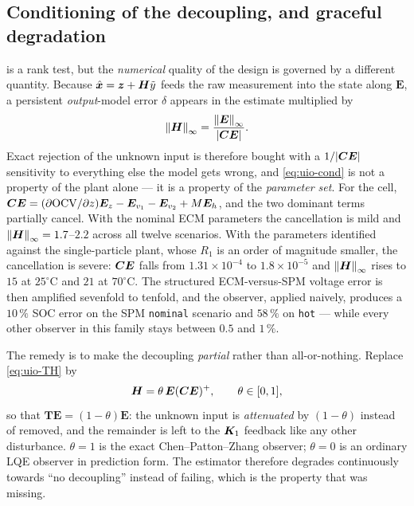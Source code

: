 \subsection{Conditioning of the decoupling, and graceful degradation}
\label{sec:uio-cond}
 is a rank test, but the \emph{numerical} quality of the design is governed by a
different quantity.  Because $\hat{\bm{x}} = \bm{z} + \bm{H}\tilde{y}$ feeds the raw measurement into the state
along $\bm{E}$, a persistent \emph{output}-model error $\delta$ appears in the estimate multiplied
by
\begin{equation}
\left\lVert \bm{H} \right\rVert_\infty = \frac{\left\lVert \bm{E} \right\rVert_\infty}{|\bm{C}\bm{E}|} .
\label{eq:uio-cond}
\end{equation}
Exact rejection of the unknown input is therefore bought with a $1/|\bm{C}\bm{E}|$ sensitivity to
everything else the model gets wrong, and \eqref{eq:uio-cond} is not a property of the plant alone
--- it is a property of the \emph{parameter set}.  For the cell,
$\bm{C}\bm{E} = (\partial\mathrm{OCV}/\partial z)\bm{E}_{z} - \bm{E}_{v_1} - \bm{E}_{v_2} + M\bm{E}_h$,
and the two dominant terms partially cancel.  With the nominal ECM parameters the cancellation is
mild and $\left\lVert \bm{H} \right\rVert_\infty = 1.7$--$2.2$ across all twelve scenarios.  With the parameters
identified against the single-particle plant, whose $R_1$ is an order of magnitude smaller, the
cancellation is severe: $\bm{C}\bm{E}$ falls from $1.31\times10^{-4}$ to $1.8\times10^{-5}$ and
$\left\lVert \bm{H} \right\rVert_\infty$ rises to $15$ at $25^\circ$C and $21$ at $70^\circ$C.  The structured
ECM-versus-SPM voltage error is then amplified sevenfold to tenfold, and the observer, applied
naively, produces a $10\,\%$ SOC error on the SPM \texttt{nominal} scenario and $58\,\%$ on
\texttt{hot} --- while every other observer in this family stays between $0.5$ and $1\,\%$.

The remedy is to make the decoupling \emph{partial} rather than all-or-nothing.  Replace
\eqref{eq:uio-TH} by
\begin{equation}
\bm{H} = \theta\,\bm{E}(\bm{C}\bm{E})^{+} , \qquad \theta\in[0,1] ,
\label{eq:uio-theta}
\end{equation}
so that $\bm{T}\bm{E} = (1-\theta)\bm{E}$: the unknown input is \emph{attenuated} by $(1-\theta)$
instead of removed, and the remainder is left to the $\bm{K}_1$ feedback like any other disturbance.
$\theta=1$ is the exact Chen--Patton--Zhang observer; $\theta=0$ is an ordinary LQE observer in
prediction form.  The estimator therefore degrades continuously towards ``no decoupling'' instead
of failing, which is the property that was missing.

